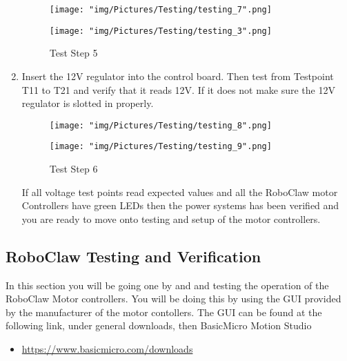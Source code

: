\documentclass[12pt]{article}
\begin{document}
\begin{enumerate}
\begin{figure}[H]
  \centering
  \begin{minipage}[b]{0.45\textwidth}
    \texttt{[image: "img/Pictures/Testing/testing\_7".png]}
  \end{minipage}
  \hfill
  \begin{minipage}[b]{0.45\textwidth}
    \texttt{[image: "img/Pictures/Testing/testing\_3".png]}
  \end{minipage}
  \caption{Test Step 5}
  \label{test_5}
\end{figure}

\item Insert the 12V regulator into the control board. Then test from Testpoint T11 to T21 and verify that it reads 12V. If it does not make sure the 12V regulator is slotted in properly.

\begin{figure}[H]
  \centering
  \begin{minipage}[b]{0.45\textwidth}
    \texttt{[image: "img/Pictures/Testing/testing\_8".png]}
  \end{minipage}
  \hfill
  \begin{minipage}[b]{0.45\textwidth}
    \texttt{[image: "img/Pictures/Testing/testing\_9".png]}
  \end{minipage}
  \caption{Test Step 6}
  \label{test_6}
\end{figure}

If all voltage test points read expected values and all the RoboClaw motor Controllers have green LEDs then the power systems has been verified and you are ready to move onto testing and setup of the motor controllers. 

\end{enumerate}

\subsection{RoboClaw Testing and Verification}

In this section you will be going one by and and testing the operation of the RoboClaw Motor controllers. You will be doing this by using the GUI provided by the manufacturer of the motor contollers. The GUI can be found at the following link, under general downloads, then BasicMicro Motion Studio

\begin{itemize}
	\item \href{https://www.basicmicro.com/downloads}{https://www.basicmicro.com/downloads}
\end{itemize}
\end{document}
